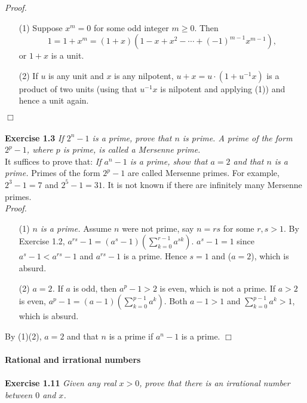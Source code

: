 \documentclass{article}
\begin{document}
\emph{Proof.}
\begin{enumerate}
\item[(1)]
Suppose $x^m = 0$ for some odd integer $m \geq 0$.
Then
$$1 = 1+x^m = (1+x)(1-x+x^2-\cdots+(-1)^{m-1}x^{m-1}),$$
or $1+x$ is a unit.
\item[(2)]
If $u$ is any unit and $x$ is any nilpotent,
$u + x= u \cdot (1 + u^{-1}x)$ is a product of two units
(using that $u^{-1}x$ is nilpotent and applying (1))
and hence a unit again.
\end{enumerate}
$\Box$ \\\\



\textbf{Exercise 1.3}
\emph{If $2^n - 1$ is a prime, prove that $n$ is prime.
A prime of the form $2^p - 1$, where $p$ is prime, is called a Mersenne prime.} \\

It suffices to prove that:
\emph{If $a^n - 1$ is a prime, show that $a = 2$ and that $n$ is a prime.}
Primes of the form $2^p - 1$ are called Mersenne primes.
For example, $2^3 - 1 = 7$ and $2^5 - 1 = 31$.
It is not known if there are infinitely many Mersenne primes. \\

\emph{Proof.}
\begin{enumerate}
\item[(1)]
\emph{$n$ is a prime.}
Assume $n$ were not prime, say $n = rs$ for some $r, s > 1$.
By Exercise 1.2,
$a^{rs} - 1 = (a^s - 1)(\sum_{k=0}^{r-1} a^{sk})$.
$a^s - 1 = 1$ since $a^s - 1 < a^{rs} - 1$ and $a^{rs} - 1$ is a prime.
Hence $s=1$ and ($a=2$), which is absurd.
\item[(2)]
\emph{$a = 2$.}
If $a$ is odd, then $a^p - 1 > 2$ is even, which is not a prime.
If $a > 2$ is even,
$a^p - 1 = (a - 1)(\sum_{k=0}^{p-1} a^k)$.
Both $a - 1 > 1$ and $\sum_{k=0}^{p-1} a^k > 1$, which is absurd.
\end{enumerate}
By (1)(2), $a = 2$ and that $n$ is a prime if $a^n - 1$ is a prime.
$\Box$ \\\\



\textbf{\large Rational and irrational numbers} \\\\



\textbf{Exercise 1.11}
\emph{Given any real $x > 0$,
prove that there is an irrational number between $0$ and $x$.} \\
\end{document}
